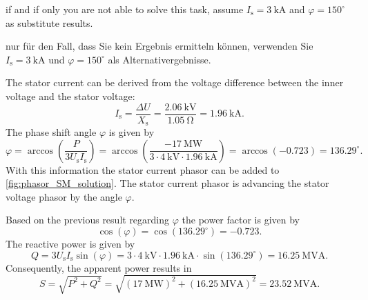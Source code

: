 \begin{hintblock}
if and if only you are not able to solve this task, assume $I_\mathrm{s} = \SI{3}{\kilo\ampere}$ and $\varphi = 150^\circ$ as substitute results.
\end{hintblock}
\begin{germanhintblock}
nur für den Fall, dass Sie kein Ergebnis ermitteln können, verwenden Sie $I_\mathrm{s} = \SI{3}{\kilo\ampere}$ und $\varphi = 150^\circ$ als Alternativergebnisse.
\end{germanhintblock}

\begin{solutionblock}
    The stator current can be derived from the voltage difference between the inner voltage and the stator voltage:
    $$
    I_\mathrm{s} = \frac{\Delta U}{X_\mathrm{s}} = \frac{\SI{2.06}{\kilo\volt}}{\SI{1.05}{\ohm}} = \SI{1.96}{\kilo\ampere}.
    $$
    The phase shift angle $\varphi$ is given by
    $$
    \varphi = \arccos\left(\frac{P}{3U_\mathrm{s}I_\mathrm{s}}\right) = \arccos\left(\frac{\SI{-17}{\mega\watt}}{3\cdot\SI{4}{\kilo\volt}\cdot\SI{1.96}{\kilo\ampere}}\right) = \arccos(-0.723) = 136.29^\circ.
    $$
    With this information the stator current phasor can be added to \autoref{fig:phasor_SM_solution}. The stator current phasor is advancing the stator voltage phasor by the angle $\varphi$.
\end{solutionblock}



\begin{solutionblock}
    Based on the previous result regarding $\varphi$ the power factor is given by
    $$
        \cos(\varphi) = \cos(136.29^\circ) = -0.723.
    $$
    The reactive power is given by
    $$
        Q = 3U_\mathrm{s}I_\mathrm{s}\sin(\varphi) = 3\cdot\SI{4}{\kilo\volt}\cdot\SI{1.96}{\kilo\ampere}\cdot\sin(136.29^\circ) = \SI{16.25}{\mega\volt\ampere}.
    $$
    Consequently, the apparent power results in
    $$
        S = \sqrt{P^2 + Q^2} = \sqrt{(\SI{17}{\mega\watt})^2 + (\SI{16.25}{\mega\volt\ampere})^2} = \SI{23.52}{\mega\volt\ampere}.
    $$
\end{solutionblock}


